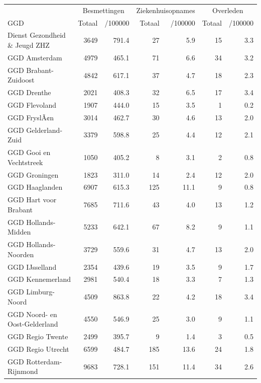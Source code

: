 \documentclass[
  english,
  man,floatsintext]{apa6}
\begin{document}
\begin{table}
\centering\begingroup\fontsize{10}{12}\selectfont

\begin{threeparttable}
\begin{tabular}{lrrrrrr}
\toprule
\multicolumn{1}{c}{ } & \multicolumn{2}{c}{Besmettingen} & \multicolumn{2}{c}{Ziekenhuisopnames} & \multicolumn{2}{c}{Overleden} \\
\cmidrule(l{3pt}r{3pt}){2-3} \cmidrule(l{3pt}r{3pt}){4-5} \cmidrule(l{3pt}r{3pt}){6-7}
GGD & Totaal & /100000 & Totaal & /100000 & Totaal & /100000\\
\midrule
Dienst Gezondheid \& Jeugd ZHZ & 3649 & 791.4 & 27 & 5.9 & 15 & 3.3\\
GGD Amsterdam & 4979 & 465.1 & 71 & 6.6 & 34 & 3.2\\
GGD Brabant-Zuidoost & 4842 & 617.1 & 37 & 4.7 & 18 & 2.3\\
GGD Drenthe & 2021 & 408.3 & 32 & 6.5 & 17 & 3.4\\
GGD Flevoland & 1907 & 444.0 & 15 & 3.5 & 1 & 0.2\\
GGD FryslÃ¢n & 3014 & 462.7 & 30 & 4.6 & 13 & 2.0\\
GGD Gelderland-Zuid & 3379 & 598.8 & 25 & 4.4 & 12 & 2.1\\
GGD Gooi en Vechtstreek & 1050 & 405.2 & 8 & 3.1 & 2 & 0.8\\
GGD Groningen & 1823 & 311.0 & 14 & 2.4 & 12 & 2.0\\
GGD Haaglanden & 6907 & 615.3 & 125 & 11.1 & 9 & 0.8\\
GGD Hart voor Brabant & 7685 & 711.6 & 43 & 4.0 & 13 & 1.2\\
GGD Hollands-Midden & 5233 & 642.1 & 67 & 8.2 & 9 & 1.1\\
GGD Hollands-Noorden & 3729 & 559.6 & 31 & 4.7 & 13 & 2.0\\
GGD IJsselland & 2354 & 439.6 & 19 & 3.5 & 9 & 1.7\\
GGD Kennemerland & 2981 & 540.4 & 18 & 3.3 & 7 & 1.3\\
GGD Limburg-Noord & 4509 & 863.8 & 22 & 4.2 & 18 & 3.4\\
GGD Noord- en Oost-Gelderland & 4550 & 546.9 & 25 & 3.0 & 9 & 1.1\\
GGD Regio Twente & 2499 & 395.7 & 9 & 1.4 & 3 & 0.5\\
GGD Regio Utrecht & 6599 & 484.7 & 185 & 13.6 & 24 & 1.8\\
GGD Rotterdam-Rijnmond & 9683 & 728.1 & 151 & 11.4 & 34 & 2.6\\

\end{tabular}
\end{threeparttable}
\end{table}
\end{document}
